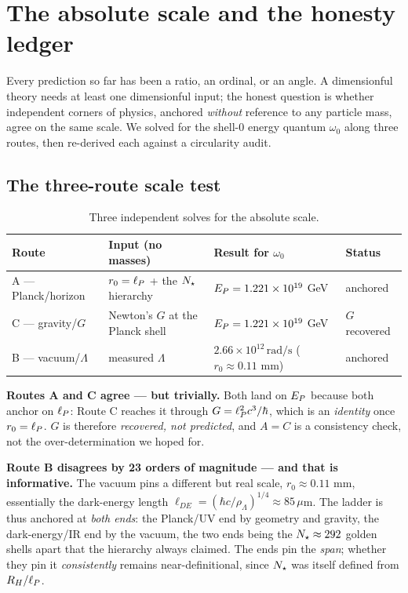 \section{The absolute scale and the honesty ledger}
\label{sec:scale}

Every prediction so far has been a ratio, an ordinal, or an angle. A dimensionful theory needs at least one dimensionful input; the honest question is whether independent corners of physics, anchored \emph{without} reference to any particle mass, agree on the same scale. We solved for the shell-0 energy quantum $\omega_0$ along three routes, then re-derived each against a circularity audit.

\subsection{The three-route scale test}

\begin{table}[h]
\centering
\begin{tabular}{llll}
\toprule
Route & Input (no masses) & Result for $\omega_0$ & Status \\
\midrule
A --- Planck/horizon & $r_0=\ell_{P}$ + the $N_{\star}$ hierarchy & $E_{P}=1.221\times10^{19}$ GeV & anchored \\
C --- gravity/$G$ & Newton's $G$ at the Planck shell & $E_{P}=1.221\times10^{19}$ GeV & $G$ recovered \\
B --- vacuum/$\Lambda$ & measured $\Lambda$ & $2.66\times10^{12}\,\mathrm{rad/s}$ ($r_0\approx0.11$ mm) & anchored \\
\bottomrule
\end{tabular}
\caption{Three independent solves for the absolute scale.}
\label{tab:scale:routes}
\end{table}

\noindent\textbf{Routes A and C agree --- but trivially.} Both land on $E_{P}$ because both anchor on $\ell_{P}$: Route C reaches it through $G=\ell_{P}^2 c^3/\hbar$, which is an \emph{identity} once $r_0=\ell_{P}$. $G$ is therefore \emph{recovered, not predicted}, and $A=C$ is a consistency check, not the over-determination we hoped for.

\noindent\textbf{Route B disagrees by 23 orders of magnitude --- and that is informative.} The vacuum pins a different but real scale, $r_0\approx0.11$ mm, essentially the dark-energy length $\ell_{DE}=(\hbar c/\rho_\Lambda)^{1/4}\approx 85\,\mu$m. The ladder is thus anchored at \emph{both ends}: the Planck/UV end by geometry and gravity, the dark-energy/IR end by the vacuum, the two ends being the $N_{\star}\approx292$ golden shells apart that the hierarchy always claimed. The ends pin the \emph{span}; whether they pin it \emph{consistently} remains near-definitional, since $N_{\star}$ was itself defined from $R_H/\ell_{P}$.

